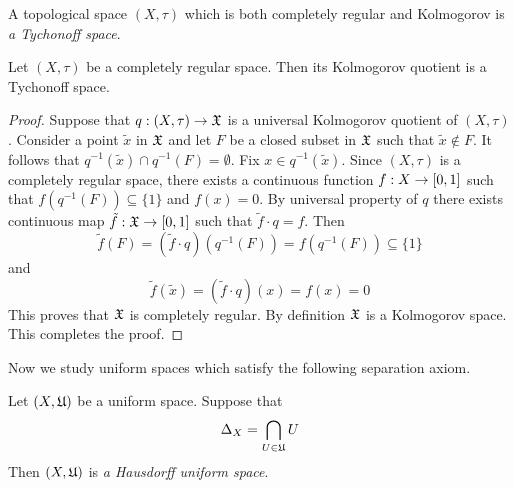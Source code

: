 \begin{definition}
A topological space $(X,\tau)$ which is both completely regular and Kolmogorov is \textit{a Tychonoff space}. 
\end{definition}

\begin{proposition}\label{proposition:Kolmogorov_quotient_of_completely_regular_space_is_Tychonoff}
Let $(X,\tau)$ be a completely regular space. Then its Kolmogorov quotient is a Tychonoff space.
\end{proposition}
\begin{proof}
Suppose that $q:\left(X,\tau\right) \rightarrow {\mathfrak X}$ is a universal Kolmogorov quotient of $\left(X,\tau\right)$. Consider a point $\tilde{x}$ in ${\mathfrak X}$ and let $F$ be a closed subset in ${\mathfrak X}$ such that $\tilde{x} \not \in F$. It follows that $q^{-1}(\tilde{x}) \cap q^{-1}(F) = \emptyset$. Fix $x \in q^{-1}(\tilde{x})$. Since $\left(X,\tau\right)$ is a completely regular space, there exists a continuous function $f:X\rightarrow [0,1]$ such that $f\left(q^{-1}(F)\right) \subseteq \{1\}$ and $f\left(x\right) = 0$. By universal property of $q$ there exists continuous map $\tilde{f}:{\mathfrak X}\rightarrow [0,1]$ such that $\tilde{f} \cdot q = f$. Then 
$$\tilde{f}(F) = \left(\tilde{f}\cdot q\right)\left(q^{-1}(F)\right) = f\left(q^{-1}\left(F\right)\right) \subseteq \{1\}$$
and 
$$\tilde{f}\left(\tilde{x}\right) = \left(\tilde{f}\cdot q\right)(x) = f(x) = 0$$
This proves that ${\mathfrak X}$ is completely regular. By definition ${\mathfrak X}$ is a Kolmogorov space. This completes the proof.
\end{proof}
\noindent
Now we study uniform spaces which satisfy the following separation axiom. 

\begin{definition}
Let $(X,{\mathfrak U})$ be a uniform space. Suppose that
$$\Delta_X = \bigcap_{U\in {\mathfrak U}}U$$
Then $(X,{\mathfrak U})$ is \textit{a Hausdorff uniform space}.
\end{definition}

